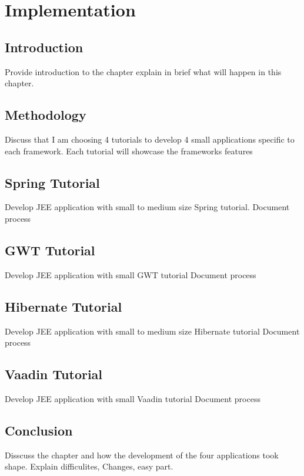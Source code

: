 \chapter*{Implementation}
\section{Introduction}
Provide introduction to the chapter explain in brief what will happen in this chapter.
\section{Methodology}
Discuss that I am choosing 4 tutorials to develop 4 small applications specific to each 
framework. Each tutorial will showcase the frameworks features
\section{Spring Tutorial}
Develop JEE application with small to medium size Spring tutorial.
Document process 
\section{GWT Tutorial}
Develop JEE application with small GWT tutorial
Document process 
\section{Hibernate Tutorial}
Develop JEE application with small to medium size Hibernate tutorial
Document process 
\section{Vaadin Tutorial}
Develop JEE application with small Vaadin tutorial
Document process 
\section{Conclusion}
Disscuss the chapter and how the development of the four applications 
took shape. Explain difficulites, Changes, easy part.